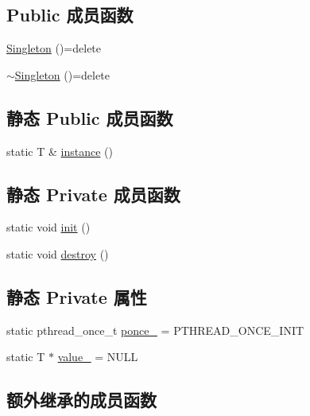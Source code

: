 \subsection*{Public 成员函数}
\begin{DoxyCompactItemize}
\item 
\hyperlink{classmuduo_1_1Singleton_a44b764c599fe2b905e668fe6e69d66ec}{Singleton} ()=delete
\item 
\hyperlink{classmuduo_1_1Singleton_a78c68a8e40364e9035e676fa558d3796}{$\sim$\+Singleton} ()=delete
\end{DoxyCompactItemize}
\subsection*{静态 Public 成员函数}
\begin{DoxyCompactItemize}
\item 
static T \& \hyperlink{classmuduo_1_1Singleton_a359703743cd890f1e3df60b6b06a5724}{instance} ()
\end{DoxyCompactItemize}
\subsection*{静态 Private 成员函数}
\begin{DoxyCompactItemize}
\item 
static void \hyperlink{classmuduo_1_1Singleton_aedc913c139bb562646d3459b0ca28997}{init} ()
\item 
static void \hyperlink{classmuduo_1_1Singleton_a112a068c3a6f373ec6c12fdf0b48987b}{destroy} ()
\end{DoxyCompactItemize}
\subsection*{静态 Private 属性}
\begin{DoxyCompactItemize}
\item 
static pthread\+\_\+once\+\_\+t \hyperlink{classmuduo_1_1Singleton_a5be9f10bcf679ada586228d592b52644}{ponce\+\_\+} = P\+T\+H\+R\+E\+A\+D\+\_\+\+O\+N\+C\+E\+\_\+\+I\+N\+IT
\item 
static T $\ast$ \hyperlink{classmuduo_1_1Singleton_a4ddc1e6e173732d80915527e28056b48}{value\+\_\+} = N\+U\+LL
\end{DoxyCompactItemize}
\subsection*{额外继承的成员函数}



